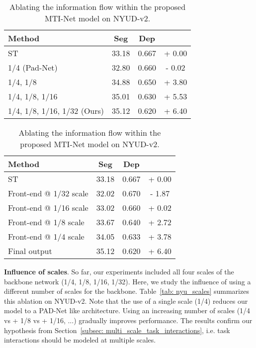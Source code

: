 \documentclass[runningheads]{llncs}
\begin{document}
\begin{table}[t]
\begin{minipage}[t]{.45\linewidth}
\caption{Influence of using a different number of scales for the backbone network on NYUD-v2.}
\label{tab: nyu_scales}
\centering
\tiny{
\begin{tabular}{|l|c|c|c|}
\hline
Method & Seg  & Dep  &  \\
\hline
ST & 33.18 & 0.667 & + 0.00 \\
1/4 (Pad-Net) & 32.80 & 0.660 & - 0.02 \\
1/4, 1/8 & 34.88 & 0.650 & + 3.80 \\
1/4, 1/8, 1/16 & 35.01 & 0.630 & + 5.53 \\
1/4, 1/8, 1/16, 1/32 (Ours) & 35.12 & 0.620 & + 6.40 \\
\hline
\end{tabular}}
\end{minipage}
\hspace*{.03\linewidth}
\begin{minipage}[t]{.45\linewidth}
\caption{Ablating the information flow within the proposed MTI-Net model on NYUD-v2.}
\label{tab: nyu_frontend}
\centering
\tiny{
\begin{tabular}{|l|c|c|c|}
\hline
Method & Seg  & Dep  &  \\
\hline
ST & 33.18 & 0.667 & + 0.00 \\
Front-end @ 1/32 scale & 32.02 & 0.670 & - 1.87 \\
Front-end @ 1/16 scale & 33.02 & 0.660 & + 0.02 \\
Front-end @ 1/8 scale  & 33.67 & 0.640 & + 2.72 \\
Front-end @ 1/4 scale & 34.05 & 0.633 & + 3.78 \\
Final output & 35.12 & 0.620 & + 6.40 \\
\hline
\end{tabular}}
\end{minipage}
\end{table}

\noindent\textbf{Influence of scales}.
So far, our experiments included all four scales of the backbone network (1/4, 1/8, 1/16, 1/32). Here, we study the influence of using a different number of scales for the backbone. Table~\ref{tab: nyu_scales} summarizes this ablation on NYUD-v2. Note that the use of a single scale (1/4) reduces our model to a PAD-Net like architecture. Using an increasing number of scales (1/4 vs + 1/8 vs + 1/16, ...) gradually improves performance. The results confirm our hypothesis from Section~\ref{subsec: multi_scale_task_interactions}, i.e. task interactions should be modeled at multiple scales. 
\end{document}
